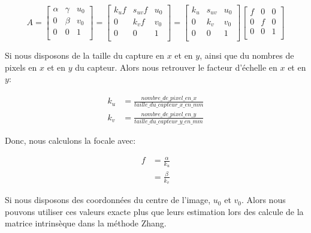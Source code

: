 \documentclass[a4paper,11pt]{article}
\begin{document}
\begin{equation}
  A=
  \begin{bmatrix}
   \alpha & \gamma & u_0 \\
   0 & \beta & v_0 \\
   0 & 0 & 1 \\
  \end{bmatrix}
  =
  \begin{bmatrix}
   k_uf & s_{uv}f & u_0 \\
   0 & k_vf & v_0 \\
   0 & 0 & 1 \\
  \end{bmatrix}
  =
  \begin{bmatrix}
   k_u & s_{uv} & u_0 \\
   0 & k_v & v_0 \\
   0 & 0 & 1 \\
  \end{bmatrix}
  \begin{bmatrix}
    f & 0 & 0 \\
    0 & f & 0 \\
    0 & 0 & 1 \\
  \end{bmatrix}
\end{equation}

Si nous disposons de la taille du capture en $x$ et en $y$, ainsi que du nombres de 
pixels en $x$ et en $y$ du capteur. Alors nous retrouver le facteur d'échelle en 
$x$ et en $y$:

\begin{equation}
\begin{aligned}
  k_u &= \frac{nombre\_de\_pixel\_en\_x}{taille\_du\_capteur\_x\_en\_mm} \\
  k_v &= \frac{nombre\_de\_pixel\_en\_y}{taille\_du\_capteur\_y\_en\_mm} 
\end{aligned}
\end{equation}

Donc, nous calculons la focale avec: 

\begin{equation}
\begin{aligned}
  f &= \frac{\alpha}{k_u} \\
  &= \frac{\beta}{k_v}
\end{aligned}
\end{equation}

Si nous disposons des coordonnées du centre de l'image, $u_0$ et $v_0$. Alors 
nous pouvons utiliser ces valeurs exacte plus que leurs estimation lors des calcule 
de la matrice intrinsèque dans la méthode Zhang.
\end{document}
